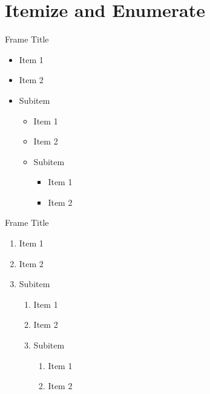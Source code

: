 \section{Itemize and Enumerate}
\begin{frame}{Frame Title}
    \begin{itemize}
        \item Item 1
        \item Item 2
        \item Subitem \begin{itemize}
                \item Item 1
                \item Item 2
                \item Subitem \begin{itemize}
                        \item Item 1
                        \item Item 2
                    \end{itemize}
            \end{itemize}
    \end{itemize}
\end{frame}
\begin{frame}{Frame Title}
    \begin{enumerate}
        \item Item 1
        \item Item 2
        \item Subitem \begin{enumerate}
                \item Item 1
                \item Item 2
                \item Subitem \begin{enumerate}
                        \item Item 1
                        \item Item 2
                    \end{enumerate}
            \end{enumerate}
    \end{enumerate}
\end{frame}
